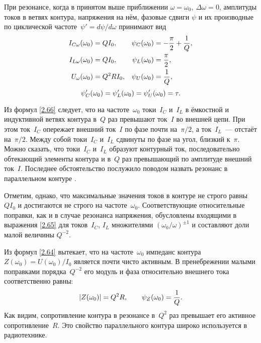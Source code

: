При резонансе, когда в принятом выше приближении
$\omega=\omega_0,~\Delta\omega=0$, амплитуды токов в ветвях контура, напряжения
на нём, фазовые сдвиги $\psi$ и их производные по циклической частоте~$\psi'=d\psi/d\omega$
принимают вид
\begin{equation}
\eqmark{2.66}
\begin{aligned}
I_{C\omega}(\omega_0)& =QI_0, &
    \psi_C(\omega_0) & =-\dfrac{\pi}{2}+\frac1Q,\\
I_{L\omega}(\omega_0)&= QI_0, &
        \psi_L(\omega_0)&=\dfrac{\pi}{2},\\
U_{\omega}(\omega_0)&=Q^2RI_0, &
\psi_U(\omega_0)&=\frac1Q,
\end{aligned}
\end{equation}
\begin{equation}
			\eqmark{2.66c}
			\psi'_C(\omega_0)=\psi'_L(\omega_0)=\psi'_U(\omega_0)=\tau.
\end{equation}

Из формул \eqref{2.66} следует, что на частоте~$\omega_0$ 
токи~$I_C$ и~$I_L$ в ёмкостной и индуктивной ветвях контура 
в~$Q$ раз превышают ток~$I$ во внешней цепи. 
При этом ток~$I_C$ опережает внешний ток~$I$ по фазе почти на~$\pi/2$, а
ток~$I_L$~--- отстаёт на~$\pi/2$. Между собой токи~$I_C$ и~$I_L$ сдвинуты по
фазе на угол, близкий к~$\pi$. Можно сказать, что токи~$I_C$ и~$I_L$ образуют
контурный ток, последовательно обтекающий элементы контура и в~$Q$ раз
превышающий по амплитуде внешний ток~$I$. Последнее обстоятельство послужило
поводом назвать резонанс в параллельном контуре .

Отметим, однако, что максимальные значения токов в контуре не строго равны
$QI_0$ и достигаются не строго на частоте~$\omega_0$. Соответствующие
относительные поправки, как и в случае резонанса напряжения, обусловлены
входящими в выражения \eqref{2.65} для токов~$I_C$, $I_L$
множителями $(\omega_0/\omega)^{\pm1}$ и составляют доли малой величины
$Q^{-2}$.

Из формул \eqref{2.64} вытекает, что на частоте~$\omega_0$ импеданс контура
$Z(\omega_0)=U(\omega_0)/I_0$ является почти чисто активным. В
пренебрежении малыми поправками порядка~$Q^{-2}$ его модуль и фаза
относительно внешнего тока соответственно равны:
\begin{equation}\eqmark{2.67}
|Z(\omega_0)|=Q^2R,
\qquad \psi_Z(\omega_0)=\frac1Q.
\end{equation}
Как видим, сопротивление контура в резонансе в~$Q^2$ раз превышает его активное
сопротивление~$R$. Это свойство параллельного контура широко используется в
радиотехнике.

